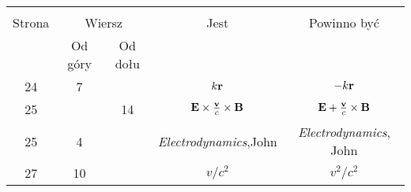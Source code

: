 \documentclass[a4paper,11pt]{article}
\begin{document}


\begin{center}

  \begin{tabular}{|c|c|c|c|c|}
    \hline
    & \multicolumn{2}{c|}{} & & \\
    Strona & \multicolumn{2}{c|}{Wiersz} & Jest & Powinno być \\ \cline{2-3}
    & Od góry & Od dołu &  &  \\ \hline
    24 & 7 & & $k \mathbf{r}$ & $-k \mathbf{r}$ \\
    25 & & 14 & $\mathbf{E} \times \frac{ \mathbf{v} }{ c } \times \mathbf{B}$
           & $\mathbf{E} + \frac{ \mathbf{v} }{ c } \times \mathbf{B}$ \\
    25 & 4 & & \emph{Electrodynamics},John & \emph{Electrodynamics}, John \\
    27 & 10 & & $v / c^{ 2 }$ & $v^{ 2 } / c^{ 2 }$ \\
    \hline
  \end{tabular}

\end{center}


\vspace{\spaceTwo}











{}






\end{document}
